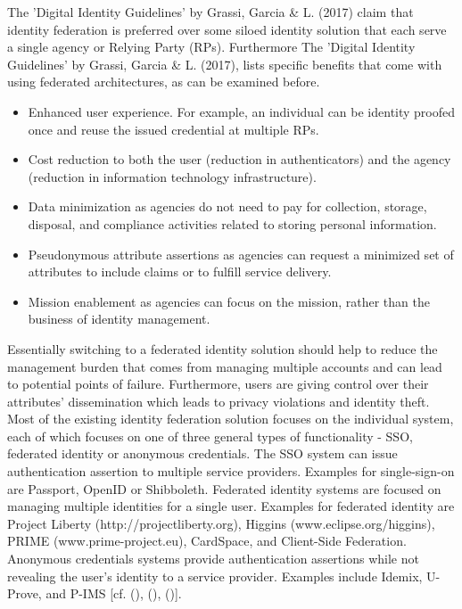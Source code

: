 {{	
	The 'Digital Identity Guidelines' by Grassi, Garcia \& L. (2017) claim that identity federation is preferred over some siloed identity solution that each serve a single agency or Relying Party (RPs). Furthermore The 'Digital Identity Guidelines' by Grassi, Garcia \& L. (2017), lists specific benefits that come with using federated architectures, as can be examined before. 
	
	\begin{itemize}
		\item Enhanced user experience. For example, an individual can be identity proofed once and reuse the issued credential at multiple RPs. 
		\item Cost reduction to both the user (reduction in authenticators) and the agency (reduction in information technology infrastructure). 
		\item Data minimization as agencies do not need to pay for collection, storage, disposal, and compliance activities related to storing personal information. 
		\item Pseudonymous attribute assertions as agencies can request a minimized set of attributes to include claims or to fulfill service delivery. 
		\item Mission enablement as agencies can focus on the mission, rather than the business of identity management.
	\end{itemize}
	
	Essentially switching to a federated identity solution should help to reduce the management burden that comes from managing multiple accounts and can lead to potential points of failure.  Furthermore, users are giving control over their attributes' dissemination which leads to privacy violations and identity theft. Most of the existing identity federation solution focuses on the individual system, each of which focuses on one of three general types of functionality - SSO, federated identity or anonymous credentials. The SSO system can issue authentication assertion to multiple service providers. Examples for single-sign-on are Passport, OpenID or Shibboleth. Federated identity systems are focused on managing multiple identities for a single user. Examples for federated identity are Project Liberty (http://projectliberty.org), Higgins (www.eclipse.org/higgins), PRIME (www.prime-project.eu), CardSpace, and
	Client-Side Federation. Anonymous credentials systems provide authentication assertions while not revealing the user's identity to a service provider. Examples include Idemix, U-Prove, and P-IMS [cf. (\cite{Birell:2013:FIMS}), (\cite{Boyed:2012:GSOA}), (\cite{NIST:2017:DIG})].
		
}}
